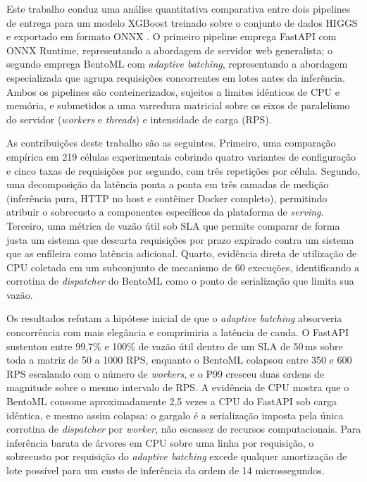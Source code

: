 Este trabalho conduz uma análise quantitativa comparativa entre dois
pipelines de entrega para um modelo XGBoost treinado sobre o conjunto de
dados HIGGS \cite{higgs2014} e exportado em formato ONNX
\cite{onnxruntime2024}. O primeiro pipeline emprega FastAPI com ONNX
Runtime, representando a abordagem de servidor web generalista; o segundo
emprega BentoML com \textit{adaptive batching}, representando a abordagem
especializada que agrupa requisições concorrentes em lotes antes da
inferência. Ambos os pipelines são conteinerizados, sujeitos a limites
idênticos de CPU e memória, e submetidos a uma varredura matricial sobre os
eixos de paralelismo do servidor (\textit{workers} e \textit{threads}) e
intensidade de carga (RPS).

As contribuições deste trabalho são as seguintes. Primeiro, uma comparação
empírica em 219 células experimentais cobrindo quatro variantes de
configuração e cinco taxas de requisições por segundo, com três repetições
por célula. Segundo, uma decomposição da latência ponta a ponta em três
camadas de medição (inferência pura, HTTP no host e contêiner Docker
completo), permitindo atribuir o sobrecusto a componentes específicos da
plataforma de \textit{serving}. Terceiro, uma métrica de vazão útil sob SLA que
permite comparar de forma justa um sistema que descarta requisições por
prazo expirado contra um sistema que as enfileira como latência adicional.
Quarto, evidência direta de utilização de CPU coletada em um subconjunto de
mecanismo de 60 execuções, identificando a corrotina de \textit{dispatcher}
do BentoML como o ponto de serialização que limita sua vazão.

Os resultados refutam a hipótese inicial de que o \textit{adaptive batching}
absorveria concorrência com mais elegância e comprimiria a latência de
cauda. O FastAPI sustentou entre 99,7\% e 100\% de vazão útil dentro de um
SLA de 50\,ms sobre toda a matriz de 50 a 1000 RPS, enquanto o BentoML
colapsou entre 350 e 600 RPS escalando com o número de \textit{workers}, e o
P99 cresceu duas ordens de magnitude sobre o mesmo intervalo de RPS. A
evidência de CPU mostra que o BentoML consome aproximadamente 2,5 vezes a
CPU do FastAPI sob carga idêntica, e mesmo assim colapsa: o gargalo é a
serialização imposta pela única corrotina de \textit{dispatcher} por
\textit{worker}, não escassez de recursos computacionais. Para inferência
barata de árvores em CPU sobre uma linha por requisição, o sobrecusto por
requisição do \textit{adaptive batching} excede qualquer amortização de
lote possível para um custo de inferência da ordem de 14 microssegundos.

